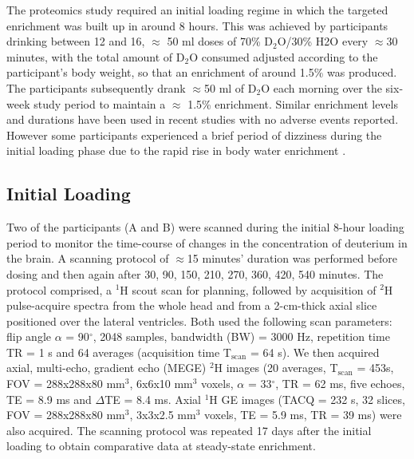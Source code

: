 \documentclass[class=article, crop=false]{standalone}
\begin{document}
The proteomics study required an initial loading regime in which the targeted enrichment was built up in around 8 hours. This was achieved by participants drinking between 12 and 16, $\approx$ 50 ml doses of 70\% D$_2$O/30\% H2O every $\approx$30 minutes, with the total amount of D$_2$O consumed adjusted according to the participant’s body weight, so that an enrichment of around 1.5\% was produced. The participants subsequently drank $\approx$50 ml of D$_2$O each morning over the six-week study period to maintain a $\approx$ 1.5\% enrichment. Similar enrichment levels and durations have been used in recent studies \cite{Robinson2011Long-termSupplementation, Burger2017LeukemiaIbrutinib, Loomba2019DiscoveryLabeling} with no adverse events reported. However some participants experienced a brief period of dizziness during the initial loading phase due to the rapid rise in body water enrichment \cite{Robinson2011Long-termSupplementation}. 


\subsection{Initial Loading}

Two of the participants (A and B) were scanned during the initial 8-hour loading period to monitor the time-course of changes in the concentration of deuterium in the brain. A scanning protocol of $\approx$15 minutes’ duration was performed before dosing and then again after 30, 90, 150, 210, 270, 360, 420, 540 minutes. The protocol comprised, a $^1$H scout scan for planning, followed by acquisition of $^2$H pulse-acquire spectra from the whole head and from a 2-cm-thick axial slice positioned over the lateral ventricles. Both used the following scan parameters: flip angle $\alpha$ = 90$^\circ$, 2048 samples, bandwidth (BW) = 3000 Hz, repetition time TR = 1 s and 64 averages (acquisition time T$_\text{scan}$ = 64 s). We then acquired axial, multi-echo, gradient echo (MEGE) $^2$H images (20 averages, T$_\text{scan}$ = 453s, FOV = 288x288x80 mm$^3$, 6x6x10 mm$^3$ voxels, $\alpha$ = 33$^\circ$, TR = 62 ms, five echoes, TE = 8.9 ms and $\Delta$TE = 8.4 ms. Axial $^1$H GE images (TACQ = 232 s, 32 slices, FOV = 288x288x80 mm$^3$, 3x3x2.5 mm$^3$ voxels, TE = 5.9 ms, TR = 39 ms) were also acquired. The scanning protocol was repeated 17 days after the initial loading to obtain comparative data at steady-state enrichment. 
\end{document}
